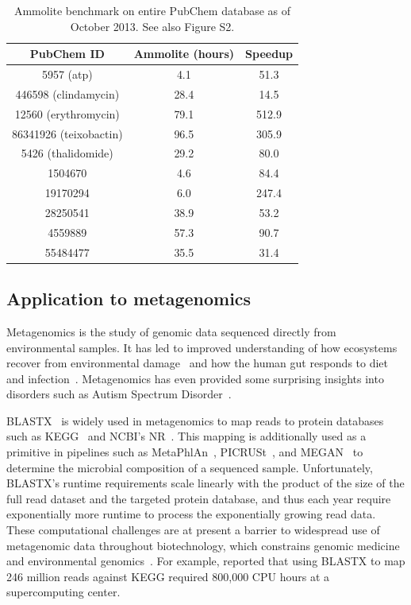 \documentclass[11pt]{elsarticle}
\renewcommand{\cite}{\citep} %
\theoremstyle{definition}
\theoremstyle{remark}
\numberwithin{equation}{section}
\begin{document}
\begin{table}
\begin{subtable}{1\textwidth}
\caption{Ammolite benchmark on entire PubChem database as of October 2013. See also Figure S2.}
\label{ammo47m}
\begin{tabular}{ccc}
\hline
PubChem ID & Ammolite (hours) & Speedup \\
\hline
5957 (atp) & 4.1 & 51.3 \\
\hline
446598 (clindamycin) & 28.4 & 14.5 \\
\hline
12560 (erythromycin) & 79.1 & 512.9 \\
\hline
86341926 (teixobactin) & 96.5 & 305.9 \\
\hline
5426 (thalidomide) & 29.2 & 80.0 \\
\hline
1504670 & 4.6 & 84.4 \\
\hline
19170294 & 6.0 & 247.4 \\
\hline
28250541 & 38.9 & 53.2\\
\hline
4559889 & 57.3 & 90.7 \\
\hline
55484477 & 35.5 & 31.4 \\
\hline
\end{tabular}
\end{subtable}
\end{table}

\subsection{Application to metagenomics}

Metagenomics is the study of genomic data sequenced directly from environmental
samples.
It has led to improved understanding of how ecosystems recover
from environmental damage~\cite{tyson2004community} and how the human gut responds 
to diet
and infection~\cite{david2014host}.
Metagenomics has even provided some surprising insights into disorders 
such as Autism Spectrum Disorder~\cite{macfabe2012short}.

BLASTX~\cite{altschul1990basic} is widely used in metagenomics to map
reads to protein databases such as KEGG~\cite{kanehisa2000kegg} and NCBI's 
NR~\cite{sayers2011database}.
This mapping is additionally used as a primitive in pipelines such as MetaPhlAn~\cite{segata2012metagenomic}, 
PICRUSt~\cite{langille2013predictive}, and MEGAN~\cite{huson2011integrative} to
determine the microbial composition of a sequenced sample.
Unfortunately, BLASTX's runtime requirements scale linearly with the product 
of the size of the full read dataset and the targeted protein database, and 
thus each year require exponentially more runtime to process the exponentially 
growing read data. 
These computational challenges are at present a barrier to widespread use of 
metagenomic data throughout biotechnology, which constrains genomic medicine 
and environmental genomics~\cite{frank2008gastrointestinal}.
For example, \citet{mackelprang2011metagenomic} reported that using BLASTX to map 246
million reads against KEGG required 800,000 CPU hours at a supercomputing 
center.
\end{document}
